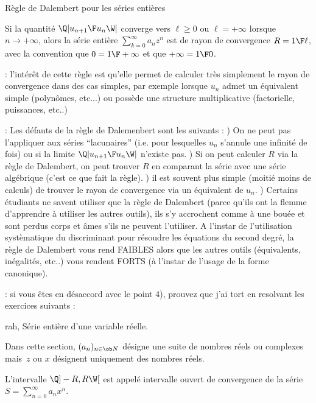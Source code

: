 \Concept Règle de Dalembert pour les séries entières

Si la quantité $\Q|{u_{n+1}\F u_n}\W|$ converge vers $\ell\ge0$ ou $\ell=+\infty$ lorsque $n\to+\infty$, 
alors la série entière $\sum_{k=0}^\infty a_nz^n$ est de rayon de convergence $R={1\F \ell}$, avec la convention que $0={1\F+\infty}$ et que $+\infty=1\F 0$. 

\Remarque : l'intérêt de cette règle est qu'elle permet de calculer très simplement le rayon de convergence dans des cas simples, par exemple lorsque $u_n$ admet un équivalent simple (polynômes, etc...) ou possède une structure multiplicative (factorielle, puissances, etc..)

\Remarque : Les défauts de la règle de Dalemenbert sont les suivants : ) On ne peut pas l'appliquer aux séries ``lacunaires'' (i.e. pour lesquelles $u_n$ s'annule une infinité de fois) ou si la limite $\Q|{u_{n+1}\F u_n}\W|$ n'existe pas. ) Si on peut calculer $R$ via la règle de Dalembert, on peut trouver $R$ en comparant la série avec une série algébrique (c'est ce que fait la règle). ) il est souvent plus simple (moitié moins de calculs) de trouver le rayon de convergence via un équivalent de $u_n$. ) Certains étudiants ne savent utiliser que la règle de Dalembert (parce qu'ils ont la flemme d'apprendre à utiliser les autres outils), ils s'y accrochent comme à une bouée et sont perdus corps et âmes s'ils ne peuvent l'utiliser. 
A l'instar de l'utilisation systèmatique du discriminant pour résoudre les équations du second degré, 
la règle de Dalembert vous rend FAIBLES alors que les autres outils (équivalents, inégalités, etc..) vous rendent FORTS (à l'instar de l'usage de la forme canonique). 
\bigskip

\Remarque : si vous êtes en désaccord avec le point 4), prouvez que j'ai tort en resolvant les exercices suivants : 

%

%

%

%


\Subsection rah, Série entière d'une variable réelle. 

Dans cette section, $(a_n)_{n\in\ob N}$ désigne une suite de nombres réels ou complexes 
mais~$z$ ou $x$ désignent uniquement des nombres réels. 
\bigskip

\Definition [$\sum_{n=0}^\infty a_nx^n$ de rayon de convergence~$R>0$] 
L'intervalle $\Q]-R,R\W[$ est appelé intervalle ouvert de convergence de la série $S=\sum_{n=0}^\infty a_nx^n$. 

